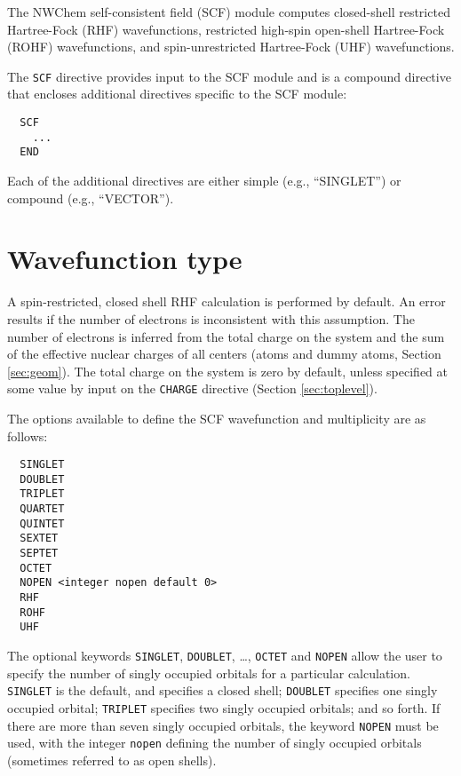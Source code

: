 \label{sec:scf}

The NWChem self-consistent field (SCF) module computes closed-shell
restricted Hartree-Fock (RHF) wavefunctions, restricted high-spin
open-shell Hartree-Fock (ROHF) wavefunctions, and spin-unrestricted
Hartree-Fock (UHF) wavefunctions.

The \verb+SCF+ directive provides input to the SCF module and is a
compound directive that encloses additional directives specific to the
SCF module:
\begin{verbatim}
  SCF
    ...
  END
\end{verbatim}

Each of the additional directives are either simple (e.g.,
``SINGLET'') or compound (e.g., ``VECTOR'').


\section{Wavefunction type}

A spin-restricted, closed shell RHF calculation is performed by
default.  An error results if the number of electrons is inconsistent
with this assumption.  The number of electrons is inferred from the
total charge on the system and the sum of the effective nuclear
charges of all centers (atoms and dummy atoms, Section
\ref{sec:geom}).  The total charge on the system is zero by default,
unless specified at some value by input on the \verb+CHARGE+ directive
(Section \ref{sec:toplevel}).

The options available to define the SCF wavefunction and multiplicity
are as follows:

\begin{verbatim}
  SINGLET 
  DOUBLET 
  TRIPLET 
  QUARTET 
  QUINTET 
  SEXTET
  SEPTET
  OCTET
  NOPEN <integer nopen default 0>
  RHF
  ROHF
  UHF
\end{verbatim}

The optional keywords \verb+SINGLET+, \verb+DOUBLET+, \ldots,
\verb+OCTET+ and \verb+NOPEN+ allow the user to specify the number of
singly occupied orbitals for a particular calculation.  \verb+SINGLET+
is the default, and specifies a closed shell; \verb+DOUBLET+ specifies
one singly occupied orbital; \verb+TRIPLET+ specifies two singly
occupied orbitals; and so forth.  If there are more than seven singly
occupied orbitals, the keyword \verb+NOPEN+ must be used, with the
integer \verb+nopen+ defining the number of singly occupied
orbitals (sometimes referred to as open shells).

